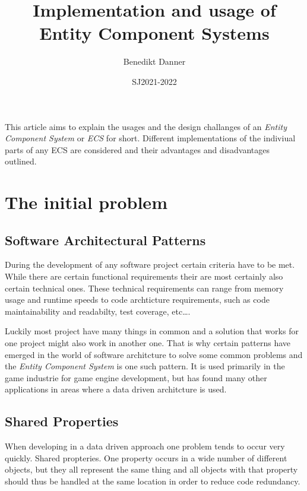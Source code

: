 \documentclass{article}
\title{Implementation and usage of \\
        Entity Component Systems}
\author{Benedikt Danner}
\date{SJ2021-2022}
\begin{document}
    \maketitle
    \begin{abstract}
        
    \end{abstract}
    This article aims to explain the usages and the design challanges of an \textit{Entity Component System} or \textit{ECS} for short. Different implementations of the indiviual parts of any ECS are considered and their advantages and disadvantages outlined.
    \pagebreak

    \tableofcontents    
    \pagebreak

    \section{The initial problem}
    \subsection{Software Architectural Patterns}
    During the development of any software project certain criteria have to be met. While there are certain functional requirements their are most certainly also certain technical ones. These technical requirements can range from memory usage and runtime speeds to code archticture requirements, such as code maintainability and readabilty, test coverage, etc\dots.
    
    Luckily most project have many things in common and a solution that works for one project might also work in another one. That is why certain patterns have emerged in the world of software architcture to solve some common problems and the \textit{Entity Component System} is one such pattern. It is used primarily in the game industrie for game engine development, but has found many other applications in areas where a data driven architcture is used.

    \subsection{Shared Properties}
    When developing in a data driven approach one problem tends to occur very quickly. Shared propteries. One property occurs in a wide number of different objects, but they all represent the same thing and all objects with that property should thus be handled at the same location in order to reduce code redundancy.
\end{document}
